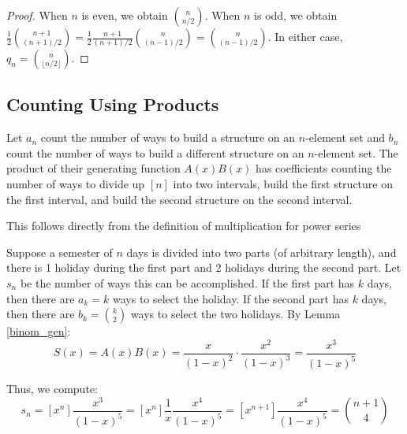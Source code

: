 \documentclass[a4paper]{article}
\begin{document}
\begin{theorem}
\begin{hl}
\begin{proof}
When $n$ is even, we obtain $\binom n{n/2}$. When $n$ is odd, we obtain $\frac12\binom{n+1}{(n+1)/2}=\frac12\frac{n+1}{(n+1)/2}\binom{n}{(n-1)/2}=\binom n{(n-1)/2}$. In either case, $q_n=\binom n{\lfloor n/2\rfloor}$.
\end{proof}
\end{hl}
\end{theorem}

\subsection{Counting Using Products}

\begin{theorem}
Let $a_n$ count the number of ways to build a structure on an $n$-element set and $b_n$ count the number of ways to build a different structure on an $n$-element set. The product of their generating function $A(x)B(x)$ has coefficients counting the number of ways to divide up $[n]$ into two intervals, build the first structure on the first interval, and build the second structure on the second interval.
\begin{arrows}
\item This follows directly from the definition of multiplication for power series
\end{arrows}
\end{theorem}

\begin{example}
Suppose a semester of $n$ days is divided into two parts (of arbitrary length), and there is 1 holiday during the first part and 2 holidays during the second part. Let $s_n$ be the number of ways this can be accomplished. If the first part has $k$ days, then there are $a_k=k$ ways to select the holiday. If the second part has $k$ days, then there are $b_k=\binom k2$ ways to select the two holidays. By Lemma \ref{binom_gen}:
\begin{equation*}
S(x)
=A(x)B(x)
=\frac{x}{(1-x)^2}\cdot \frac{x^2}{(1-x)^3}
=\frac{x^3}{(1-x)^5}
\end{equation*}

Thus, we compute:
\begin{equation*}
s_n
=[x^n]\frac{x^3}{(1-x)^5}
=[x^n]\frac1x\frac{x^4}{(1-x)^5}
=[x^{n+1}]\frac{x^4}{(1-x)^5}
=\binom{n+1}4
\end{equation*}
\end{example}
\end{document}
